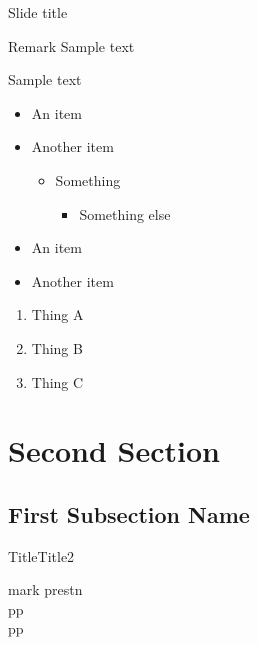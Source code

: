 \documentclass{beamer}
\begin{document}
\begin{frame}{Slide title}

  \begin{block}{Remark}
    Sample text
  \end{block}
  
  \begin{block}{}
    Sample text
  \end{block}
  
  \begin{itemize}
    \item
    An item
    \item
    Another item
    \begin{itemize}
      \item Something
      \begin{itemize}
        \item Something else
      \end{itemize}
    \end{itemize}
      \end{itemize}
  
  \begin{itemize}
    \item
    An item
    \item
    Another item
  \end{itemize}
  
  \begin{enumerate}
      \item Thing A
      \item Thing B
      \item Thing C
    \end{enumerate}
      
\end{frame}


\section{Second Section}
\subsection[Short Second Subsection Name]{First Subsection Name}

\begin{frame}{Title}{Title2}
\begin{block}{mark}
prestn\\pp\\pp\\
\end{block}
\end{frame}
\end{document}
